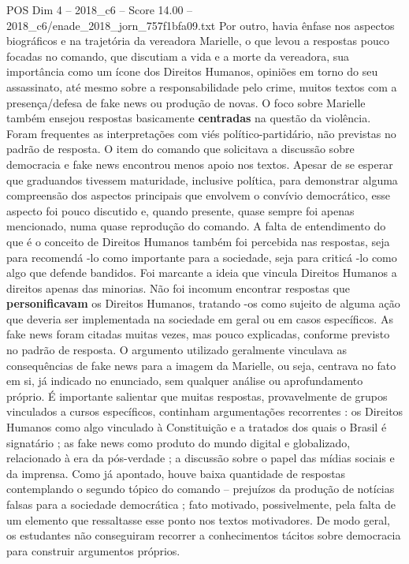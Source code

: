 \begin{textsample}{POS Dim 4 – 2018\_c6 – Score 14.00 – 2018\_c6/enade\_2018\_jorn\_757f1bfa09.txt}
Por outro, havia ênfase nos aspectos biográficos e na trajetória da vereadora Marielle, o que levou a respostas pouco focadas no comando, que discutiam a vida e a morte da vereadora, sua importância como um ícone dos Direitos Humanos, opiniões em torno do seu assassinato, até mesmo sobre a responsabilidade pelo crime, muitos textos com a presença/defesa de fake news ou produção de novas.
O foco sobre Marielle também ensejou respostas basicamente \textbf{centradas} na questão da violência.
Foram frequentes as interpretações com viés político-partidário, não previstas no padrão de resposta.
O item do comando que solicitava a discussão sobre democracia e fake news encontrou menos apoio nos textos.
Apesar de se esperar que graduandos tivessem maturidade, inclusive política, para demonstrar alguma compreensão dos aspectos principais que envolvem o convívio democrático, esse aspecto foi pouco discutido e, quando presente, quase sempre foi apenas mencionado, numa quase reprodução do comando.
A falta de entendimento do que é o conceito de Direitos Humanos também foi percebida nas respostas, seja para recomendá -lo como importante para a sociedade, seja para criticá -lo como algo que defende bandidos.
Foi marcante a ideia que vincula Direitos Humanos a direitos apenas das minorias.
Não foi incomum encontrar respostas que \textbf{personificavam} os Direitos Humanos, tratando -os como sujeito de alguma ação que deveria ser implementada na sociedade em geral ou em casos específicos.
As fake news foram citadas muitas vezes, mas pouco explicadas, conforme previsto no padrão de resposta.
O argumento utilizado geralmente vinculava as consequências de fake news para a imagem da Marielle, ou seja, centrava no fato em si, já indicado no enunciado, sem qualquer análise ou aprofundamento próprio.
É importante salientar que muitas respostas, provavelmente de grupos vinculados a cursos específicos, continham argumentações recorrentes : os Direitos Humanos como algo vinculado à Constituição e a tratados dos quais o Brasil é signatário ; as fake news como produto do mundo digital e globalizado, relacionado à era da pós-verdade ; a discussão sobre o papel das mídias sociais e da imprensa.
Como já apontado, houve baixa quantidade de respostas contemplando o segundo tópico do comando – prejuízos da produção de notícias falsas para a sociedade democrática ; fato motivado, possivelmente, pela falta de um elemento que ressaltasse esse ponto nos textos motivadores.
De modo geral, os estudantes não conseguiram recorrer a conhecimentos tácitos sobre democracia para construir argumentos próprios.

\end{textsample}
